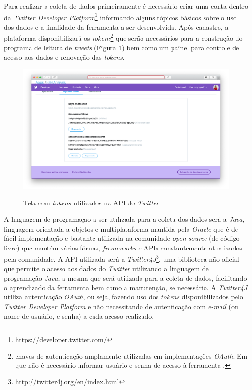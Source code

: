 Para realizar a coleta de dados primeiramente é necessário criar uma conta dentro da \textit{Twitter Developer Platform}\footnote{\url{https://developer.twitter.com/}} informando alguns tópicos básicos sobre o uso dos dados e a finalidade da ferramenta a ser desenvolvida. Após cadastro, a plataforma disponibilizará os \textit{tokens}\footnote{chaves de autenticação amplamente utilizadas em implementações \textit{OAuth}. Em que não é necessário informar usuário e senha de acesso à ferramenta \cite{hardt2012oauth}.} que serão necessários para a construção do programa de leitura de \textit{tweets} (Figura \ref{fig:twitterdeveloperplatform}) bem como um painel para controle de acesso aos dados e renovação das \textit{tokens}.

\begin{figure}[!h]
\centering 
\caption{Tela com \textit{tokens} utilizados na API do \textit{Twitter}}
\includegraphics[scale=0.3]{imagens/twitterdeveloperplatform.png}
\label{fig:twitterdeveloperplatform}
\end{figure}

A linguagem de programação a ser utilizada para a coleta dos dados será a \textit{Java}, linguagem orientada a objetos e multiplataforma mantida pela \textit{Oracle} que é de fácil implementação e bastante utilizada na comunidade \textit{open source} (de código livre) que mantém vários fóruns, \textit{frameworks} e APIs constantemente atualizados pela comunidade. A API utilizada será a \textit{Twitter4J}\footnote{\url{http://twitter4j.org/en/index.html}}, uma biblioteca não-oficial que permite o acesso aos dados do \textit{Twitter} utilizando a linguagem de programação \textit{Java}, a mesma que será utilizada para a coleta de dados, facilitando o aprendizado da ferramenta bem como a manutenção, se necessário. A \textit{Twitter4J} utiliza autenticação \textit{OAuth}, ou seja, fazendo uso dos \textit{tokens} disponibilizados pelo \textit{Twitter Developer Platform} e não necessitando de autenticação com \textit{e-mail} (ou nome de usuário, e senha) a cada acesso realizado. 

